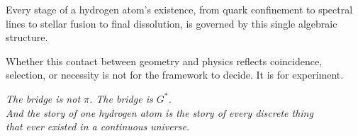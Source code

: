 \documentclass[12pt]{article}
\theoremstyle{compact}
\begin{document}
Every stage of a hydrogen atom's existence, from quark confinement to spectral lines to stellar fusion to final dissolution, is governed by this single algebraic structure.

Whether this contact between geometry and physics reflects coincidence, selection, or necessity is not for the framework to decide. It is for experiment.

\medskip

\begin{center}\itshape
The bridge is not $\pi$. The bridge is ${G^{*}}$.\\[3pt]
And the story of one hydrogen atom is the story of every discrete thing\\
that ever existed in a continuous universe.
\end{center}
\end{document}
